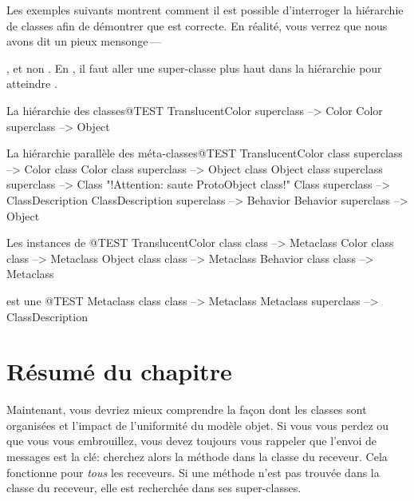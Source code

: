 \documentclass[a4paper,10pt,twoside]{book}
\begin{document}
Les exemples suivants montrent comment il est possible d'interroger la hiérarchie de classes afin de démontrer que  est correcte.
En réalité, vous verrez que nous avons dit un pieux mensonge\,---\, {, et non . En \pharo, il faut aller une super-classe plus haut dans la hiérarchie pour atteindre .

\begin{example}{La hiérarchie des classes}{@TEST}
TranslucentColor superclass			--> Color
Color superclass			        --> Object
\end{example}

\begin{example}{La hi{é}rarchie parall{è}le des méta-classes}{@TEST}
TranslucentColor class superclass          --> Color class
Color class superclass                     --> Object class
Object class superclass superclass         --> Class    "!Attention: saute ProtoObject class!"
Class superclass                           --> ClassDescription
ClassDescription superclass                --> Behavior
Behavior superclass                        --> Object
\end{example}

\begin{example}{Les instances de }{@TEST}
TranslucentColor class class        --> Metaclass
Color class class                   --> Metaclass
Object class class                  --> Metaclass
Behavior class class                --> Metaclass
\end{example}

\begin{example}{ est une }{@TEST}
Metaclass class class --> Metaclass
Metaclass superclass --> ClassDescription
\end{example}

\section{Résumé du chapitre}

Maintenant, vous devriez mieux comprendre la façon dont les classes sont organisées et l'impact de l'uniformité du modèle objet.
Si vous vous perdez ou que vous vous embrouillez, vous devez toujours vous rappeler que l'envoi de messages est la clé: cherchez alors la méthode dans la classe du receveur.
Cela fonctionne pour \emph{tous} les receveurs.
Si une méthode n'est pas trouvée dans la classe du receveur, elle est recherchée dans ses super-classes.


}
\end{document}
